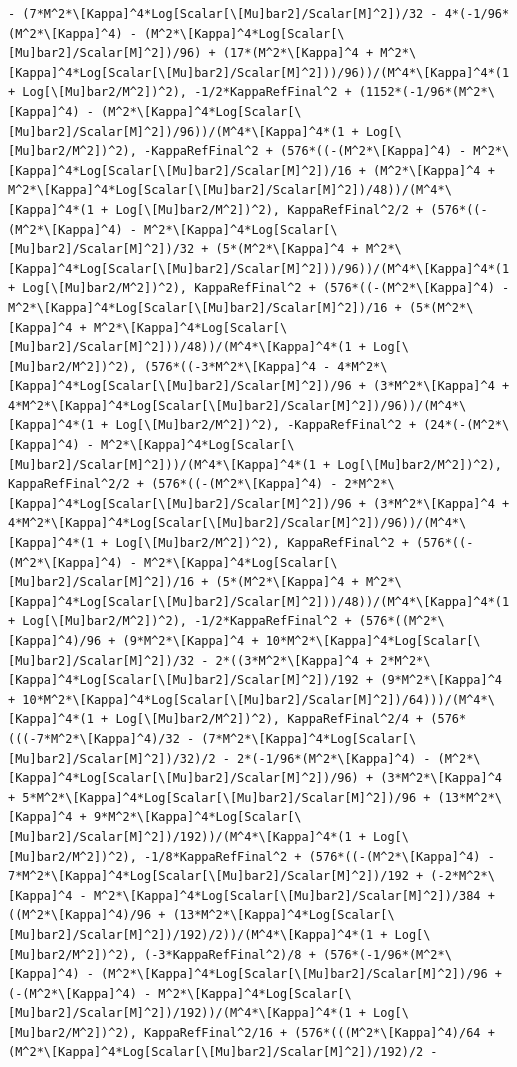 \documentclass[11pt]{article}
\begin{document}
\begin{verbatim}
- (7*M^2*\[Kappa]^4*Log[Scalar[\[Mu]bar2]/Scalar[M]^2])/32 - 4*(-1/96*(M^2*\[Kappa]^4) - (M^2*\[Kappa]^4*Log[Scalar[\[Mu]bar2]/Scalar[M]^2])/96) + (17*(M^2*\[Kappa]^4 + M^2*\[Kappa]^4*Log[Scalar[\[Mu]bar2]/Scalar[M]^2]))/96))/(M^4*\[Kappa]^4*(1 + Log[\[Mu]bar2/M^2])^2), -1/2*KappaRefFinal^2 + (1152*(-1/96*(M^2*\[Kappa]^4) - (M^2*\[Kappa]^4*Log[Scalar[\[Mu]bar2]/Scalar[M]^2])/96))/(M^4*\[Kappa]^4*(1 + Log[\[Mu]bar2/M^2])^2), -KappaRefFinal^2 + (576*((-(M^2*\[Kappa]^4) - M^2*\[Kappa]^4*Log[Scalar[\[Mu]bar2]/Scalar[M]^2])/16 + (M^2*\[Kappa]^4 + M^2*\[Kappa]^4*Log[Scalar[\[Mu]bar2]/Scalar[M]^2])/48))/(M^4*\[Kappa]^4*(1 + Log[\[Mu]bar2/M^2])^2), KappaRefFinal^2/2 + (576*((-(M^2*\[Kappa]^4) - M^2*\[Kappa]^4*Log[Scalar[\[Mu]bar2]/Scalar[M]^2])/32 + (5*(M^2*\[Kappa]^4 + M^2*\[Kappa]^4*Log[Scalar[\[Mu]bar2]/Scalar[M]^2]))/96))/(M^4*\[Kappa]^4*(1 + Log[\[Mu]bar2/M^2])^2), KappaRefFinal^2 + (576*((-(M^2*\[Kappa]^4) - M^2*\[Kappa]^4*Log[Scalar[\[Mu]bar2]/Scalar[M]^2])/16 + (5*(M^2*\[Kappa]^4 + M^2*\[Kappa]^4*Log[Scalar[\[Mu]bar2]/Scalar[M]^2]))/48))/(M^4*\[Kappa]^4*(1 + Log[\[Mu]bar2/M^2])^2), (576*((-3*M^2*\[Kappa]^4 - 4*M^2*\[Kappa]^4*Log[Scalar[\[Mu]bar2]/Scalar[M]^2])/96 + (3*M^2*\[Kappa]^4 + 4*M^2*\[Kappa]^4*Log[Scalar[\[Mu]bar2]/Scalar[M]^2])/96))/(M^4*\[Kappa]^4*(1 + Log[\[Mu]bar2/M^2])^2), -KappaRefFinal^2 + (24*(-(M^2*\[Kappa]^4) - M^2*\[Kappa]^4*Log[Scalar[\[Mu]bar2]/Scalar[M]^2]))/(M^4*\[Kappa]^4*(1 + Log[\[Mu]bar2/M^2])^2), KappaRefFinal^2/2 + (576*((-(M^2*\[Kappa]^4) - 2*M^2*\[Kappa]^4*Log[Scalar[\[Mu]bar2]/Scalar[M]^2])/96 + (3*M^2*\[Kappa]^4 + 4*M^2*\[Kappa]^4*Log[Scalar[\[Mu]bar2]/Scalar[M]^2])/96))/(M^4*\[Kappa]^4*(1 + Log[\[Mu]bar2/M^2])^2), KappaRefFinal^2 + (576*((-(M^2*\[Kappa]^4) - M^2*\[Kappa]^4*Log[Scalar[\[Mu]bar2]/Scalar[M]^2])/16 + (5*(M^2*\[Kappa]^4 + M^2*\[Kappa]^4*Log[Scalar[\[Mu]bar2]/Scalar[M]^2]))/48))/(M^4*\[Kappa]^4*(1 + Log[\[Mu]bar2/M^2])^2), -1/2*KappaRefFinal^2 + (576*((M^2*\[Kappa]^4)/96 + (9*M^2*\[Kappa]^4 + 10*M^2*\[Kappa]^4*Log[Scalar[\[Mu]bar2]/Scalar[M]^2])/32 - 2*((3*M^2*\[Kappa]^4 + 2*M^2*\[Kappa]^4*Log[Scalar[\[Mu]bar2]/Scalar[M]^2])/192 + (9*M^2*\[Kappa]^4 + 10*M^2*\[Kappa]^4*Log[Scalar[\[Mu]bar2]/Scalar[M]^2])/64)))/(M^4*\[Kappa]^4*(1 + Log[\[Mu]bar2/M^2])^2), KappaRefFinal^2/4 + (576*(((-7*M^2*\[Kappa]^4)/32 - (7*M^2*\[Kappa]^4*Log[Scalar[\[Mu]bar2]/Scalar[M]^2])/32)/2 - 2*(-1/96*(M^2*\[Kappa]^4) - (M^2*\[Kappa]^4*Log[Scalar[\[Mu]bar2]/Scalar[M]^2])/96) + (3*M^2*\[Kappa]^4 + 5*M^2*\[Kappa]^4*Log[Scalar[\[Mu]bar2]/Scalar[M]^2])/96 + (13*M^2*\[Kappa]^4 + 9*M^2*\[Kappa]^4*Log[Scalar[\[Mu]bar2]/Scalar[M]^2])/192))/(M^4*\[Kappa]^4*(1 + Log[\[Mu]bar2/M^2])^2), -1/8*KappaRefFinal^2 + (576*((-(M^2*\[Kappa]^4) - 7*M^2*\[Kappa]^4*Log[Scalar[\[Mu]bar2]/Scalar[M]^2])/192 + (-2*M^2*\[Kappa]^4 - M^2*\[Kappa]^4*Log[Scalar[\[Mu]bar2]/Scalar[M]^2])/384 + ((M^2*\[Kappa]^4)/96 + (13*M^2*\[Kappa]^4*Log[Scalar[\[Mu]bar2]/Scalar[M]^2])/192)/2))/(M^4*\[Kappa]^4*(1 + Log[\[Mu]bar2/M^2])^2), (-3*KappaRefFinal^2)/8 + (576*(-1/96*(M^2*\[Kappa]^4) - (M^2*\[Kappa]^4*Log[Scalar[\[Mu]bar2]/Scalar[M]^2])/96 + (-(M^2*\[Kappa]^4) - M^2*\[Kappa]^4*Log[Scalar[\[Mu]bar2]/Scalar[M]^2])/192))/(M^4*\[Kappa]^4*(1 + Log[\[Mu]bar2/M^2])^2), KappaRefFinal^2/16 + (576*(((M^2*\[Kappa]^4)/64 + (M^2*\[Kappa]^4*Log[Scalar[\[Mu]bar2]/Scalar[M]^2])/192)/2 - 
\end{verbatim}
\end{document}
